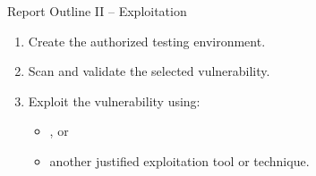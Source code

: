 \begin{frame}[t]{Report Outline II -- Exploitation}
\begin{enumerate}
  \setlength{\itemsep}{0.25cm}
  \item Create the authorized testing environment.
  \item Scan and validate the selected vulnerability.
  \item Exploit the vulnerability using:
    \begin{itemize}
      \item {}, or
      \item another justified exploitation tool or technique.
    \end{itemize}
\end{enumerate}
\vspace{0.15cm}
\end{frame}
